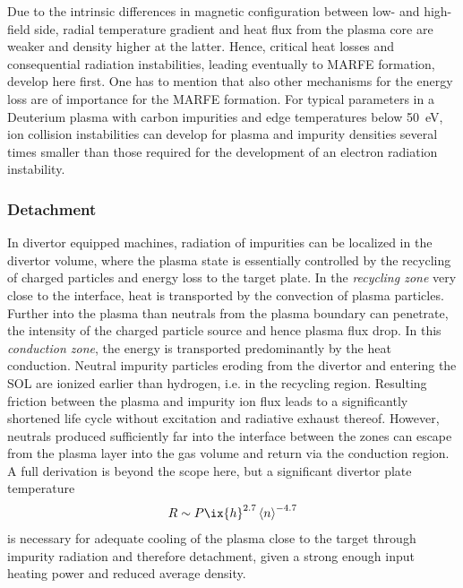 %
                Due to the intrinsic differences in magnetic configuration between low- and high-field side, radial temperature gradient and heat flux from the plasma core are weaker and density higher at the latter. Hence, critical heat losses and consequential radiation instabilities, leading eventually to MARFE formation, develop here first. One has to mention that also other mechanisms for the energy loss are of importance for the MARFE formation. For typical parameters in a Deuterium plasma with carbon impurities and edge temperatures below \SI{50}{\electronvolt}, ion collision instabilities can develop for plasma and impurity densities several times smaller than those required for the development of an electron radiation instability\cite{Tokar2010}.%
%
            \subsubsection*{Detachment}%
%
                In divertor equipped machines, radiation of impurities can be localized in the divertor volume, where the plasma state is essentially controlled by the recycling of charged particles and energy loss to the target plate. In the \textit{recycling zone} very close to the interface, heat is transported by the convection of plasma particles. Further into the plasma than neutrals from the plasma boundary can penetrate, the intensity of the charged particle source and hence plasma flux drop. In this \textit{conduction zone}, the energy is transported predominantly by the heat conduction. Neutral impurity particles eroding from the divertor and entering the SOL are ionized earlier than hydrogen, i.e. in the recycling region. Resulting friction between the plasma and impurity ion flux leads to a significantly shortened life cycle without excitation and radiative exhaust thereof. However, neutrals produced sufficiently far into the interface between the zones can escape from the plasma layer into the gas volume and return via the conduction region\cite{Wang2022}. A full derivation is beyond the scope here, but a significant divertor plate temperature%
%
                \begin{align}%
                    R\sim P\ix{h}^{2.7}\left\langle n\right\rangle^{-4.7}\nonumber%
                \end{align}%
%
                is necessary for adequate cooling of the plasma close to the target through impurity radiation and therefore detachment, given a strong enough input heating power and reduced average density\cite{Tokar2010,Greenwald2002}.%